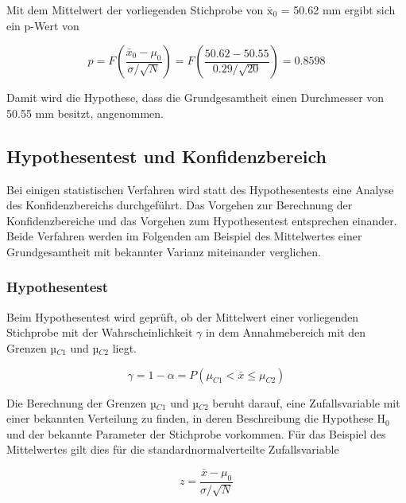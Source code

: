 \noindent Mit dem Mittelwert der vorliegenden Stichprobe von ${\overline{\mathrm{x}}}_0$ = 50.62 mm ergibt sich ein p-Wert von 

\begin{equation}\label{eq:sixfourtyfour}
p=F\left(\dfrac{\bar{x}_{0} -\mu _{0}}{\sigma /\sqrt{N}} \right)=F\left(\dfrac{50.62-50.55}{0.29/\sqrt{20}} \right)=0.8598
\end{equation}

\noindent Damit wird die Hypothese, dass die Grundgesamtheit einen Durchmesser von 50.55 mm besitzt, angenommen.

\clearpage

\subsection{Hypothesentest und Konfidenzbereich}

\noindent Bei einigen statistischen Verfahren wird statt des Hypothesentests eine Analyse des Konfidenzbereichs durchgef\"{u}hrt. Das Vorgehen zur Berechnung der Konfidenzbereiche und das Vorgehen zum Hypothesentest entsprechen einander. Beide Verfahren werden im Folgenden am Beispiel des Mittelwertes einer Grundgesamtheit mit bekannter Varianz miteinander verglichen.


\subsubsection{Hypothesentest}

\noindent Beim Hypothesentest wird gepr\"{u}ft, ob der Mittelwert einer vorliegenden Stichprobe mit der Wahrscheinlichkeit $\gamma$ in dem Annahmebereich mit den Grenzen µ$_{C1}$ und µ$_{C2}$ liegt. 

\begin{equation}\label{eq:sixfourtyfive}
\gamma =1-\alpha =P\left(\mu _{C1} <\bar{x}\le \mu _{C2} \right)
\end{equation}

\noindent Die Berechnung der Grenzen µ$_{C1}$ und µ$_{C2}$ beruht darauf, eine Zufallsvariable mit einer bekannten Verteilung zu finden, in deren Beschreibung die Hypothese H$_{0}$ und der bekannte Parameter der Stichprobe vorkommen. F\"{u}r das Beispiel des Mittelwertes gilt dies f\"{u}r die standardnormalverteilte Zufallsvariable

\begin{equation}\label{eq:sixfourtysix}
z=\dfrac{\bar{x}-\mu _{0}}{\sigma /\sqrt{N}}
\end{equation}

